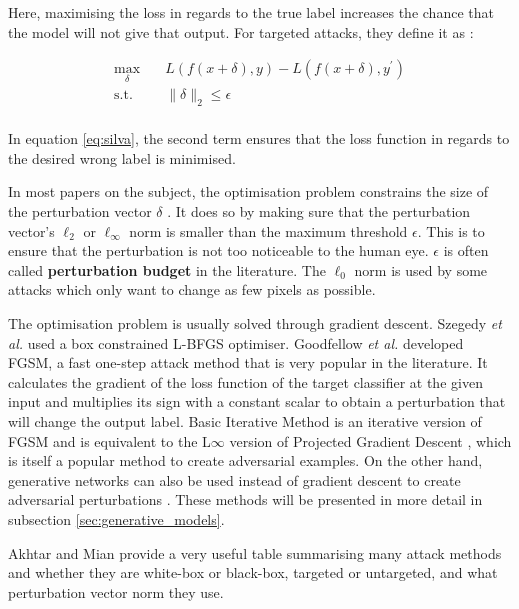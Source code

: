 Here, maximising the loss in regards to the true label increases the chance that the model will not give that output. For targeted attacks, they define it as :

\begin{equation}
\label{eq:silva}
\begin{aligned}
\max_{\delta} \quad & L(f(x + \delta), y) - L(f(x + \delta), y^\prime)\\
\textrm{s.t.} \quad& \|\delta\|_2\leq\epsilon   \\
\end{aligned}
\end{equation}

In equation \ref{eq:silva}, the second term ensures that the loss function in regards to the desired wrong label is minimised.

In most papers on the subject, the optimisation problem constrains the size of the perturbation vector $\delta$ \cite{akhtar, silva_survey, tnnls_survey}. It does so by making sure that the perturbation vector's $\ell_2$ or $\ell_\infty$ norm is smaller than the maximum threshold $\epsilon$. This is to ensure that the perturbation is not too noticeable to the human eye. $\epsilon$ is often called \textbf{perturbation budget} in the literature. The $\ell_0$ norm is used by some attacks \cite{akhtar} which only want to change as few pixels as possible. 

The optimisation problem is usually solved through gradient descent. Szegedy \textit{et al.} \cite{szegedy2014intriguing} used a box constrained L-BFGS optimiser. Goodfellow \textit{et al.} \cite{fgsm} developed FGSM, a fast one-step attack method that is very popular in the literature. It calculates the gradient of the loss function of the target classifier at the given input and multiplies its sign with a constant scalar to obtain a perturbation that will change the output label.  Basic Iterative Method is an iterative version of FGSM \cite{kurakin2016adversarial} and is equivalent to the L$\infty$ version of Projected Gradient Descent \cite{madry2019deep}, which is itself a popular method to create adversarial examples. On the other hand, generative networks can also be used instead of gradient descent to create adversarial perturbations \cite{upset_angri, zheng_black_box_GAN, advGAN}. These methods will be presented in more detail in subsection \ref{sec:generative_models}. 

Akhtar and Mian \cite{akhtar} provide a very useful table summarising many attack methods and whether they are white-box or black-box, targeted or untargeted, and what perturbation vector norm they use.

